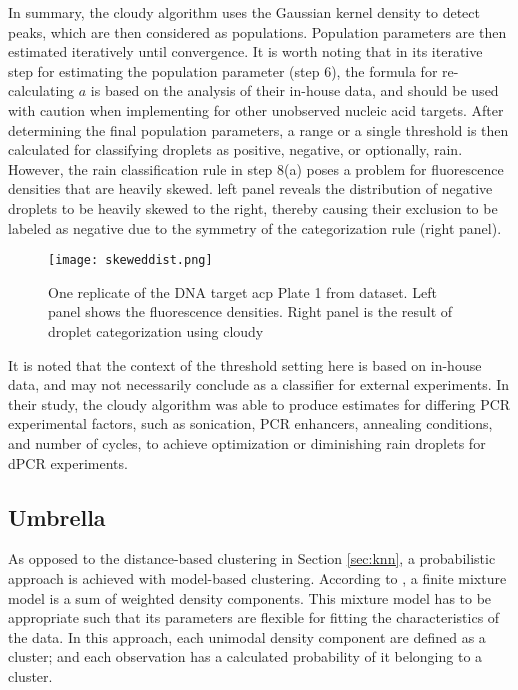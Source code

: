 In summary, the cloudy algorithm uses the Gaussian kernel density to detect peaks, which are then considered as populations. Population parameters are then estimated iteratively until convergence. It is worth noting that in its iterative step for estimating the population parameter (step 6), the formula for re-calculating \(a\) is based on the analysis of their in-house data, and should be used with caution when implementing for other unobserved nucleic acid targets. After determining the final population parameters, a range or a single threshold is then calculated for classifying droplets as positive, negative, or optionally, rain. However, the rain classification rule in step 8(a) poses a problem for fluorescence densities that are heavily skewed.  left panel reveals the distribution of negative droplets to be heavily skewed to the right, thereby causing their exclusion to be labeled as negative due to the symmetry of the categorization rule (right panel).

\begin{figure}[h]
    \centering
    \texttt{[image: skeweddist.png]}
    \caption[Fluorescence distribution of DNA target acp]{One replicate of the DNA target acp Plate 1 from  dataset. Left panel shows the fluorescence densities. Right panel is the result of droplet categorization using cloudy}
        \label{fig:skeweddist}
\end{figure}

It is noted that the context of the threshold setting here is based on in-house data, and may not necessarily conclude as a classifier for external experiments. In their study, the cloudy algorithm was able to produce estimates for differing PCR experimental factors, such as sonication, PCR enhancers, annealing conditions, and number of cycles, to achieve optimization or diminishing rain droplets for dPCR experiments.


\subsection{Umbrella}
\label{sec:nonparamdensityest}

As opposed to the distance-based clustering in Section \ref{sec:knn}, a probabilistic approach is achieved with model-based clustering. According to , a finite mixture model is a sum of weighted density components. This mixture model has to be appropriate such that its parameters are flexible for fitting the characteristics of the data. In this approach, each unimodal density component are defined as a cluster; and each observation has a calculated probability of it belonging to a cluster. 

